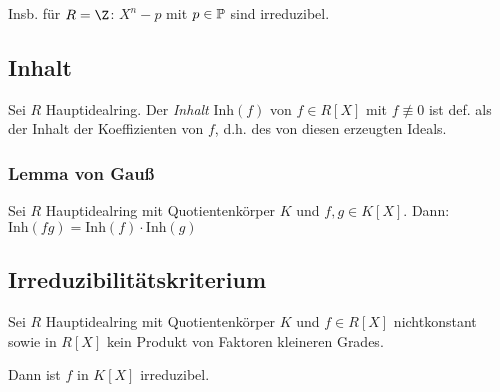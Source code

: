 Insb. für $R = \Z$: $X^n - p$ mit $p \in \mathbb{P}$ sind irreduzibel.

\subsection*{Inhalt}

Sei $R$ Hauptidealring. Der \emph{Inhalt} $\text{Inh}(f)$ von $f \in R[X]$ mit $f \not\equiv 0$ ist def. als der Inhalt der Koeffizienten von $f$, d.h. des von diesen erzeugten Ideals.

\subsubsection*{Lemma von Gauß}

Sei $R$ Hauptidealring mit Quotientenkörper $K$ und $f, g \in K[X]$. Dann: $\text{Inh}(fg) = \text{Inh}(f)\cdot\text{Inh}(g)$

\subsection*{Irreduzibilitätskriterium}

Sei $R$ Hauptidealring mit Quotientenkörper $K$ und $f \in R[X]$ nichtkonstant sowie in $R[X]$ kein Produkt von Faktoren kleineren Grades.

Dann ist $f$ in $K[X]$ irreduzibel.
